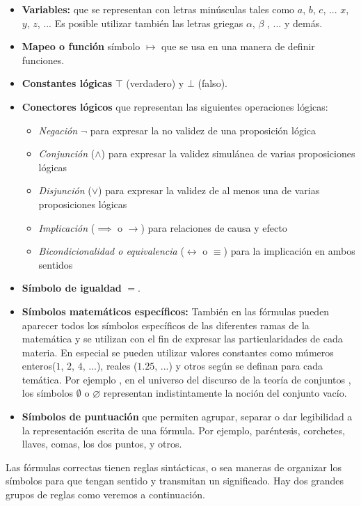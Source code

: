 \begin{itemize}
\item{\textbf{Variables:} que se representan con letras minúsculas tales como $a$, $b$, $c$, ... $x$, $y$, $z$, ... Es posible  utilizar también las letras griegas $\alpha$, $\beta$ , ... y demás.}
\item{\textbf{Mapeo o función} símbolo $\mapsto$ que se usa en una manera de definir funciones.}
\item{\textbf{Constantes lógicas} $\top$ (verdadero) y $\bot$ (falso).}
\item{\textbf{Conectores lógicos} que representan las siguientes operaciones lógicas:}
	\begin{itemize}
		\item{\textit{Negación} $\neg$ para expresar la no validez de una proposición lógica}
		\item{\textit{Conjunción} ($\land$) para expresar la validez simulánea de varias proposiciones lógicas}
		\item{\textit{Disjunción} ($\lor$) para expresar la validez de al menos una de varias proposiciones lógicas}
		\item{\textit{Implicación} ($\implies$ o $\to$) para relaciones de causa y efecto}
		\item{\textit{Bicondicionalidad o equivalencia} ($\leftrightarrow$ o $\equiv$) para la implicación en ambos sentidos}
	\end{itemize}
\item{\textbf{Símbolo de igualdad} $=$.}
\item{\textbf{Símbolos matemáticos específicos:} También en las fórmulas pueden aparecer todos los símbolos específicos de las diferentes ramas de la matemática y se utilizan con el fin de expresar las particularidades de cada materia. En especial se pueden utilizar valores constantes como múmeros enteros($1$, $2$, $4$, ...), reales ($1.25$, ...) y otros según se definan para cada temática. Por ejemplo , en el universo del discurso de la teoría de conjuntos , los símbolos $\emptyset$ o $\varnothing$ representan indistintamente la noción del conjunto vacío.}
\item{\textbf{Símbolos de puntuación} que permiten agrupar, separar o dar legibilidad a la representación escrita de una fórmula. Por ejemplo, paréntesis, corchetes, llaves, comas, los dos puntos, y otros.}
\end{itemize}

Las fórmulas correctas tienen reglas sintácticas, o sea maneras de organizar los símbolos para que tengan sentido y transmitan un significado. Hay dos grandes grupos de reglas como veremos a continuación. 

